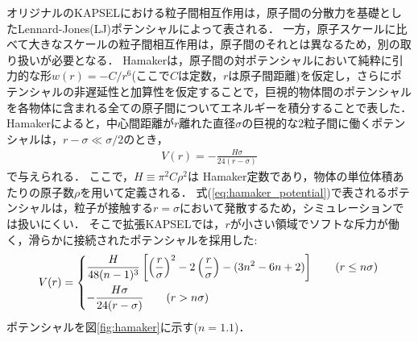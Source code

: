 \documentclass[pdflatex,a4paper,10pt,ja=standard]{bxjsarticle}
\begin{document}
オリジナルのKAPSELにおける粒子間相互作用は，原子間の分散力を基礎としたLennard-Jones(LJ)ポテンシャルによって表される．
一方，原子スケールに比べて大きなスケールの粒子間相互作用は，原子間のそれとは異なるため，別の取り扱いが必要となる\autocite{islaelachvili1996intermolecular}．
Hamakerは，原子間の対ポテンシャルにおいて純粋に引力的な形$w(r) = - C / r^{6}$(ここで$C$は定数，$r$は原子間距離)を仮定し，さらにポテンシャルの非遅延性と加算性を仮定することで，巨視的物体間のポテンシャルを各物体に含まれる全ての原子間についてエネルギーを積分することで表した\autocite{hamaker1937london}．
Hamakerによると，中心間距離が$r$離れた直径$\sigma$の巨視的な2粒子間に働くポテンシャルは，$r - \sigma \ll \sigma / 2$のとき，
\begin{align}
    V(r) = -\frac{H\sigma}{24(r-\sigma)}
    \label{eq:hamaker_potential}
\end{align}
で与えられる．
ここで，$H \equiv \pi^{2} C \rho^2$は Hamaker定数であり，物体の単位体積あたりの原子数$\rho$を用いて定義される．
式(\ref{eq:hamaker_potential})で表されるポテンシャルは，粒子が接触する$r = \sigma$において発散するため，シミュレーションでは扱いにくい．
そこで拡張KAPSELでは，$r$が小さい領域でソフトな斥力が働く，滑らかに接続されたポテンシャルを採用した:
\begin{align}
    V(r) = 
    \begin{dcases}
        \frac{H}{48(n-1)^3}\left[ \left(\frac{r}{\sigma}\right)^{2} - 2 \left(\frac{r}{\sigma}\right) - (3 n^{2} - 6n + 2)\right] \qquad (r \leq n\sigma)\\
        -\frac{H \sigma}{24(r-\sigma)} \qquad (r > n\sigma) \\
    \end{dcases}
    \label{eq:repulsive_hamaker_potential}
\end{align}
ポテンシャルを図\ref{fig:hamaker}に示す($n=1.1$)．
\end{document}
